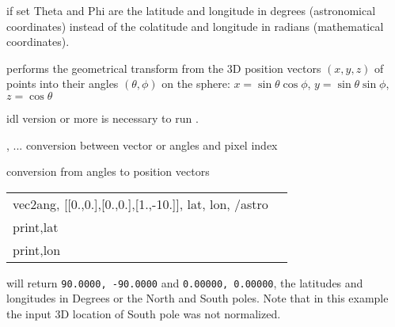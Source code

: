 \begin{keywords}
  \begin{kwlist}{} %
    \item[ASTRO\mytarget{idl:vec2ang:ASTRO}%
 =] if set Theta and Phi are the latitude and longitude in
    degrees (astronomical coordinates) instead of the colatitude and longitude
    in radians (mathematical coordinates).
  \end{kwlist}
\end{keywords}  

\begin{codedescription}
{\facname performs the geometrical transform from the 3D position vectors
$(x,y,z)$ of
points 
into their angles $(\theta,\phi)$ on the sphere:
$x = \sin\theta\cos\phi$, $y=\sin\theta\sin\phi$, $z=\cos\theta$}
\end{codedescription}



\begin{related}
  \begin{sulist}{} %
    \item[idl] version \idlversion or more is necessary to run \facname.	
    \item[\htmlref{pix2xxx}{idl:pix_tools}, ... ] conversion between vector or angles and pixel index
    \item[\htmlref{ang2vec}{idl:ang2vec}] conversion from angles to position vectors
  \end{sulist}
\end{related}

\begin{example}
{
\begin{tabular}{ll} %
vec2ang, [[0.,0.],[0.,0.],[1.,-10.]], lat, lon, /astro\\
print,lat\\
print,lon\\
\end{tabular}
}
{will return \texttt{90.0000, -90.0000} and \texttt{0.00000, 0.00000}, the latitudes and longitudes in Degrees
or the North and South poles. Note that in this example the input 3D location of South pole was not normalized.
}
\end{example}
